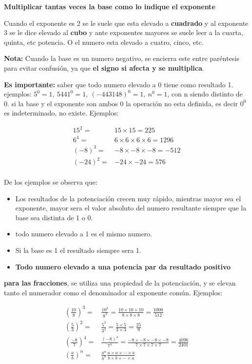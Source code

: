 \documentclass[12pt]{article}
\begin{document}
    \textbf{Multiplicar tantas veces la base como lo indique el exponente}

    Cuando el exponente es 2 se le suele que esta elevado a \textbf{cuadrado}
    y al exponente 3 se le dice elevado al \textbf{cubo} y ante exponentes mayores
    se suele leer a la cuarta, quinta, etc potencia. O el numero esta elevado a
    cuatro, cinco, etc.

    \textbf{Nota:} Cuando la base es un numero negativo, se encierra este entre
    paréntesis para evitar confusión, ya que \textbf{el signo si afecta y se
    multiplica}.

    \textbf{Es importante: } saber que todo numero elevado a 0 tiene como resultado
    1. ejemplos: $5^0=1,\ 5441^0=1,\ (-443148)^0=1,\ n^0 = 1 $, con n siendo distinto de 0.
    si la base y el exponente son ambos 0 la operación no esta definida, es decir
    $0^0$ es indeterminado, no existe.
    Ejemplos:

    \begin{align*}
        15^2 =& 15\times15 = 225\\
        6^4 =& 6\times6\times6\times6 = 1296\\
        (-8)^3 =& -8\times-8\times-8 = -512\\
        (-24)^2 =& -24\times-24= 576\\
     \end{align*}

    De los ejemplos se observa que:
    \begin{itemize}
        \item Los resultados de la potenciación crecen muy rápido, mientras
            mayor sea  el exponente, mayor sera el valor absoluto del numero resultante
            siempre que la base sea distinta de 1 o 0.
        \item todo numero elevado a 1 es el mismo numero.
        \item Si la base es 1 el resultado siempre sera 1.
        \item \textbf{Todo numero elevado a una potencia par da resultado positivo}
    \end{itemize}

    \textbf{para las fracciones}, se utiliza una propiedad de la potenciación, y se
    elevan tanto el numerador como el denominador al exponente común. Ejemplos:

    \begin{align*}
        \left(\frac{10}{8}\right)^3=& \frac{10^3}{8^3} = \frac{10\times10\times10}{8\times8\times8} = \frac{1000}{512}\\
        \left(\frac{5}{3}\right)^{2} =& \frac{5^2}{3^2}= \frac{5\times5}{3\times3} = \frac{25}{9} \\
        \left(\frac{-8}{7}\right)^{4} =& \frac{(-8)^4}{7^4}= \frac{-8\times-8\times-8\times-8}{7\times7\times7\times7} = \frac{4096}{2401} \\
        \left(\frac{a}{b}\right)^{n} =& \frac{a^n}{b^n} \frac{a\times a\times \cdots\times a}{b\times b\times \cdots\times a}
     \end{align*}
\end{document}

